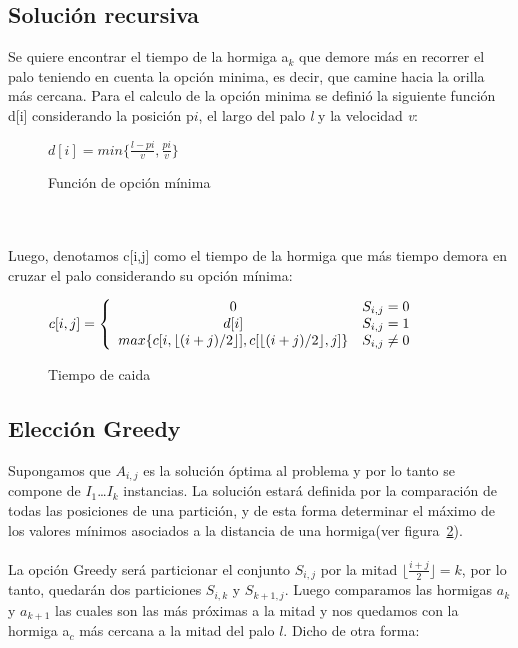 \documentclass[11pt,spanish]{article}
\begin{document}
\newpage
\subsection{Solución recursiva}
Se quiere encontrar el tiempo de la hormiga a$_{k}$ que demore más en recorrer el palo teniendo en cuenta la opción minima, es decir, que camine hacia la orilla más cercana. Para el calculo de la opción minima se definió la siguiente función d[i] considerando la posición p${i}$, el largo del palo \emph{l} y la velocidad \emph{v}:\\
\begin{figure}[h]
\begin{center}
$d[i] = min\{\frac{l - p{i}}{v},\frac{p{i}}{v}\}$
\caption{Función de opción mínima}
\label{fig:opmin}
\end{center}
\end{figure}
\\\\
Luego, denotamos c[i,j] como el tiempo de la hormiga que más tiempo demora en cruzar el palo considerando su opción mínima:\\
\begin{figure}[h]
\begin{center}$c[i,j] = \left\{
\begin{array}{c l}  
  0 & S_{i,j} = 0\\
  d[i] & S_{i,j} = 1\\
  max \{c[i,\lfloor(i+j)/2\rfloor],c[\lfloor(i+j)/2\rfloor,j]\} & S_{i,j} \neq 0
\end{array}
\right.
$
\caption{Tiempo de caida}
\label{fig:opmin}\end{center}
\end{figure}
\subsection{Elección Greedy}
Supongamos que $A_{i,j}$ es la solución óptima al problema y por lo tanto se compone de $I_1$\dots$I_k$ instancias. La solución estará definida por la comparación de todas las posiciones de una partición, y de esta forma determinar el máximo de los valores mínimos asociados a la distancia de una hormiga(ver figura~\ref{fig:opmin}).\\\\La opción Greedy será particionar el conjunto $S_{i,j}$ por la mitad $\lfloor\frac{i+j}{2}\rfloor = k$, por lo tanto, quedarán dos particiones $S_{i,k}$ y $S_{k+1,j}$. Luego comparamos las hormigas $a_k$ y $a_{k+1}$ las cuales son las más próximas a la mitad y nos quedamos con la hormiga a$_{c}$ más cercana a la mitad del palo $l$. Dicho de otra forma:
\end{document}
